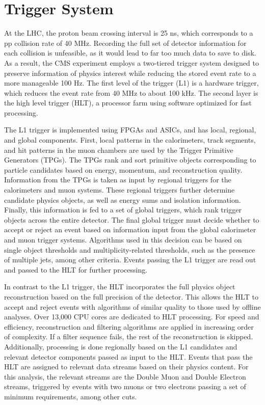 \section{Trigger System}
At the LHC, the proton beam crossing interval is 25 ns, which corresponds to a pp collision rate of 40 MHz. Recording the full set of detector information for each collision is unfeasible, as it 
would lead to far too much data to save to disk. As a result, the CMS experiment employs a two-tiered trigger system designed to preserve information of physics interest while reducing the 
stored event rate to a more manageable 100 Hz. The first level of the trigger (L1) is a hardware trigger, which reduces the event rate from 40 MHz to about 100 kHz. The second layer is the 
high level trigger (HLT), a processor farm using software optimized for fast processing. 

The L1 trigger is implemented using FPGAs and ASICs, and has local, regional, and global components. First, local patterns in the calorimeters, track segments, and hit patterns in the muon chambers 
are used by the Trigger Primitive Generators (TPGs). The TPGs rank and sort primitive objects corresponding to particle candidates based on energy, momentum, and reconstruction quality. Information
from the TPGs is taken as input by regional triggers for the calorimeters and muon systems. These regional triggers further determine candidate physics objects, as well as energy sums and isolation
information. Finally, this information is fed to a set of global triggers, which rank trigger objects across the entire detector. The final global trigger must decide whether to accept or 
reject an event based on information input from the global calorimeter and muon trigger systems. Algorithms used in this decision can be based on single object \pT thresholds and multiplicity-related 
thresholds, such as the presence of multiple jets, among other criteria. Events passing the L1 trigger are read out and passed to the HLT for further processing. 

In contrast to the L1 trigger, the HLT incorporates the full physics object reconstruction based on the full precision of the detector. This allows the HLT to accept and reject events with algorithms 
of similar quality to those used by offline analyses. Over 13,000 CPU cores are dedicated to HLT processing. For speed and efficiency, reconstruction and filtering algorithms are applied in increasing order of complexity. If a filter sequence fails, the rest of the reconstruction is skipped. Additionally, processing is done regionally based on the L1 candidates and relevant detector components 
passed as input to the HLT. Events that pass the HLT are assigned to relevant data streams based on their physics content. For this analysis, the relevant streams are the Double Muon and 
Double Electron streams, triggered by events with two muons or two electrons passing a set of minimum \pT requirements, among other cuts. 

